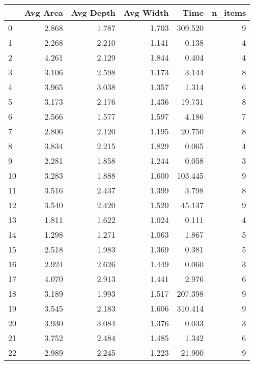\begin{tabular}{lrrrrr}
\toprule
{} &  Avg Area &  Avg Depth &  Avg Width &     Time &  n\_items \\
\midrule
0   &     2.868 &      1.787 &      1.703 &  309.520 &        9 \\
1   &     2.268 &      2.210 &      1.141 &    0.138 &        4 \\
2   &     4.261 &      2.129 &      1.844 &    0.404 &        4 \\
3   &     3.106 &      2.598 &      1.173 &    3.144 &        8 \\
4   &     3.965 &      3.038 &      1.357 &    1.314 &        6 \\
5   &     3.173 &      2.176 &      1.436 &   19.731 &        8 \\
6   &     2.566 &      1.577 &      1.597 &    4.186 &        7 \\
7   &     2.806 &      2.120 &      1.195 &   20.750 &        8 \\
8   &     3.834 &      2.215 &      1.829 &    0.065 &        4 \\
9   &     2.281 &      1.858 &      1.244 &    0.058 &        3 \\
10  &     3.283 &      1.888 &      1.600 &  103.445 &        9 \\
11  &     3.516 &      2.437 &      1.399 &    3.798 &        8 \\
12  &     3.540 &      2.420 &      1.520 &   45.137 &        9 \\
13  &     1.811 &      1.622 &      1.024 &    0.111 &        4 \\
14  &     1.298 &      1.271 &      1.063 &    1.867 &        5 \\
15  &     2.518 &      1.983 &      1.369 &    0.381 &        5 \\
16  &     2.924 &      2.626 &      1.449 &    0.060 &        3 \\
17  &     4.070 &      2.913 &      1.441 &    2.976 &        6 \\
18  &     3.189 &      1.993 &      1.517 &  207.398 &        9 \\
19  &     3.545 &      2.183 &      1.606 &  310.414 &        9 \\
20  &     3.930 &      3.084 &      1.376 &    0.033 &        3 \\
21  &     3.752 &      2.484 &      1.485 &    1.342 &        6 \\
22  &     2.989 &      2.245 &      1.223 &   21.900 &        9 \\

\end{tabular}
